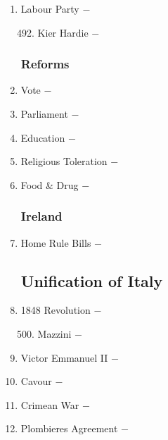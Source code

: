 \documentclass[12pt]{article}
\begin{document}
\begin{enumerate}
\item Labour Party $-$

\begin{enumerate}[label=\arabic{*}.]
\setcounter{enumii}{491}

\item Kier Hardie $-$ 

\end{enumerate}
\setcounter{enumi}{492}

\subsubsection{Reforms}

\item Vote $-$ 

\item Parliament $-$ 

\item Education $-$ 

\item Religious Toleration $-$ 

\item Food \& Drug $-$ 

\subsubsection{Ireland}

\item Home Rule Bills $-$ 

\subsection{Unification of Italy}

\item 1848 Revolution $-$ 

\begin{enumerate}[label=\arabic{*}.]
\setcounter{enumii}{499}

\item Mazzini $-$ 

\end{enumerate}
\setcounter{enumi}{500}

\item Victor Emmanuel II $-$

\item Cavour $-$ 

\item Crimean War $-$ 

\item Plombieres Agreement $-$ 


\end{enumerate}
\end{document}
